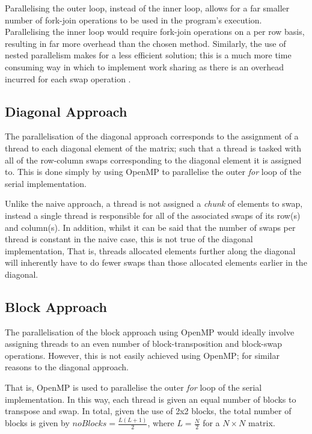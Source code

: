 \documentclass[journal,10pt]{IEEEtran}
\begin{document}
Parallelising the outer loop, instead of the inner loop, allows for a far smaller number of fork-join operations to be used in the program's execution. Parallelising the inner loop would require fork-join operations on a per row basis, resulting in far more overhead than the chosen method. Similarly, the use of nested parallelism makes for a less efficient solution; this is a much more time consuming way in which to implement work sharing as there is an overhead incurred for each swap operation \cite{Chapter356:online}. %

\subsection{Diagonal Approach}
The parallelisation of the diagonal approach corresponds to the assignment of a thread to each diagonal element of the matrix; such that a thread is tasked with all of the row-column swaps corresponding to the diagonal element it is assigned to. This is done simply by using OpenMP to parallelise the outer \textit{for} loop of the serial implementation.

Unlike the naive approach, a thread is not assigned a \textit{chunk} of elements to swap, instead a single thread is responsible for all of the associated swaps of its row(s) and column(s). In addition, whilst it can be said that the number of swaps per thread is constant in the naive case, this is not true of the diagonal implementation, That is, threads allocated elements further along the diagonal will inherently have to do fewer swaps than those allocated elements earlier in the diagonal.

\subsection{Block Approach}

The parallelisation of the block approach using OpenMP would ideally involve assigning threads to an even number of block-transposition and block-swap operations. However, this is not easily achieved using OpenMP; for similar reasons to the diagonal approach.


That is, OpenMP is used to parallelise the outer \textit{for} loop of the serial implementation. In this way, each thread is given an equal number of blocks to transpose and swap. In total, given the use of 2x2 blocks, the total number of blocks is given by $noBlocks=\frac{L(L+1)}{2}$, where $L=\frac{N}{2}$ for a $N\times N$ matrix.
\end{document}
